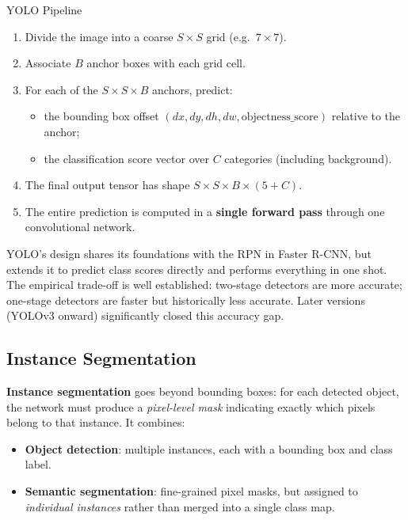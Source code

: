 \documentclass[11pt,a4paper]{article}
\newcommand{\term}[1]{\textcolor{DefGreen}{\textbf{#1}}\index{#1}}
\begin{document}
\begin{thmbox}{YOLO Pipeline}
\begin{enumerate}
  \item Divide the image into a coarse $S \times S$ grid (e.g.\ $7 \times 7$).
  \item Associate $B$ anchor boxes with each grid cell.
  \item For each of the $S \times S \times B$ anchors, predict:
    \begin{itemize}
      \item the bounding box offset $(dx, dy, dh, dw, \text{objectness\_score})$ relative to the anchor;
      \item the classification score vector over $C$ categories (including background).
    \end{itemize}
  \item The final output tensor has shape $S \times S \times B \times (5 + C)$.
  \item The entire prediction is computed in a \textbf{single forward pass} through one convolutional network.
\end{enumerate}
\end{thmbox}

YOLO's design shares its foundations with the RPN in Faster R-CNN, but extends it to predict class scores directly and performs everything in one shot. The empirical trade-off is well established: two-stage detectors are more accurate; one-stage detectors are faster but historically less accurate. Later versions (YOLOv3 onward) significantly closed this accuracy gap.

\subsection{Instance Segmentation}
\label{sec:instance_seg}

\term{Instance segmentation} goes beyond bounding boxes: for each detected object, the network must produce a \emph{pixel-level mask} indicating exactly which pixels belong to that instance. It combines:
\begin{itemize}
  \item \textbf{Object detection}: multiple instances, each with a bounding box and class label.
  \item \textbf{Semantic segmentation}: fine-grained pixel masks, but assigned to \emph{individual instances} rather than merged into a single class map.
\end{itemize}
\end{document}
